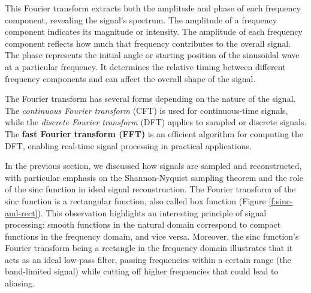 This Fourier transform extracts both the amplitude and phase of each frequency component, revealing the signal's spectrum. The amplitude of a frequency component indicates its magnitude or intensity. The amplitude of each frequency component reflects how much that frequency contributes to the overall signal. The phase represents the initial angle or starting position of the sinusoidal wave at a particular frequency. It determines the relative timing between different frequency components and can affect the overall shape of the signal.



The Fourier transform has several forms depending on the nature of the signal. The \textit{continuous Fourier transform} (CFT) is used for continuous-time signals, while the \textit{discrete Fourier transform} (DFT) applies to sampled or discrete signals. The \textbf{fast Fourier transform (FFT)} is an efficient algorithm for computing the DFT, enabling real-time signal processing in practical applications.

In the previous section, we discussed how signals are sampled and reconstructed, with particular emphasis on the Shannon-Nyquist sampling theorem and the role of the sinc function in ideal signal reconstruction. The Fourier transform of the sinc function is a rectangular function, also called box function (Figure \ref{f:sinc-and-rect}). This observation highlights an interesting principle of signal processing: smooth functions in the natural domain correspond to compact functions in the frequency domain, and vice versa. Moreover, the sinc function's Fourier transform being a rectangle in the frequency domain illustrates that it acts as an ideal low-pass filter, passing frequencies within a certain range (the band-limited signal) while cutting off higher frequencies that could lead to aliasing.

